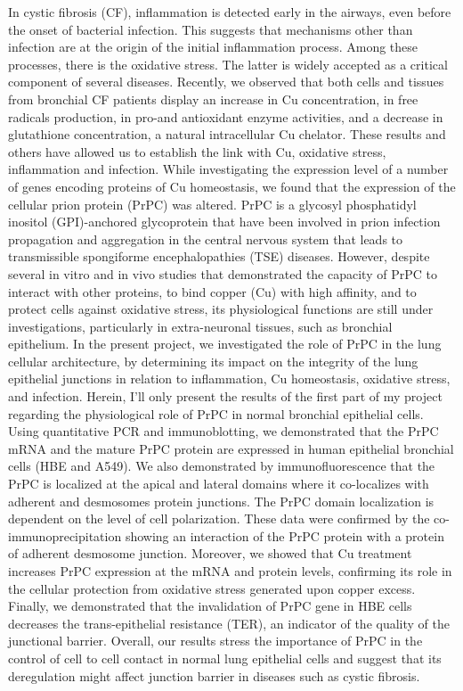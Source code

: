 In cystic fibrosis (CF), inflammation is detected early in the airways, even before the onset of bacterial infection. This suggests that mechanisms other than infection are at the origin of the initial inflammation process. Among these processes, there is the oxidative stress. The latter is widely accepted as a critical component of several diseases. 
Recently, we observed that both cells and tissues from bronchial CF patients display an increase in Cu concentration, in free radicals production, in pro-and antioxidant enzyme activities, and a decrease in glutathione concentration, a natural intracellular Cu chelator. These results and others have allowed us to establish the link with Cu, oxidative stress, inflammation and infection.
While investigating the expression level of a number of genes encoding proteins of Cu homeostasis, we found that the expression of the cellular prion protein (PrPC) was altered. PrPC is a glycosyl phosphatidyl inositol (GPI)-anchored glycoprotein that have been involved in prion infection propagation and aggregation in the central nervous system that leads to transmissible spongiforme encephalopathies (TSE) diseases. 
However, despite several in vitro and in vivo studies that demonstrated the capacity of PrPC to interact with other proteins, to bind copper (Cu) with high affinity, and to protect cells against oxidative stress, its physiological functions are still under investigations, particularly in extra-neuronal tissues, such as bronchial epithelium. 
In the present project, we investigated the role of PrPC in the lung cellular architecture, by determining its impact on the integrity of the lung epithelial junctions in relation to inflammation, Cu homeostasis, oxidative stress, and infection.
Herein, I’ll only present the results of the first part of my project regarding the physiological role of PrPC in normal bronchial epithelial cells. Using quantitative PCR and immunoblotting, we demonstrated that the PrPC mRNA and the mature PrPC protein are expressed in human epithelial bronchial cells (HBE and A549). We also demonstrated by immunofluorescence that the PrPC is localized at the apical and lateral domains where it co-localizes with adherent and desmosomes protein junctions. The PrPC domain localization is dependent on the level of cell polarization. These data were confirmed by the co-immunoprecipitation showing an interaction of the PrPC protein with a protein of adherent desmosome junction. Moreover, we showed that Cu treatment increases PrPC expression at the mRNA and protein levels, confirming its role in the cellular protection from oxidative stress generated upon copper excess. Finally, we demonstrated that the invalidation of PrPC gene in HBE cells decreases the trans-epithelial resistance (TER), an indicator of the quality of the junctional barrier. 
Overall, our results stress the importance of PrPC in the control of cell to cell contact in normal lung epithelial cells and suggest that its deregulation might affect junction barrier in diseases such as cystic fibrosis.


\endgroup

\vfill